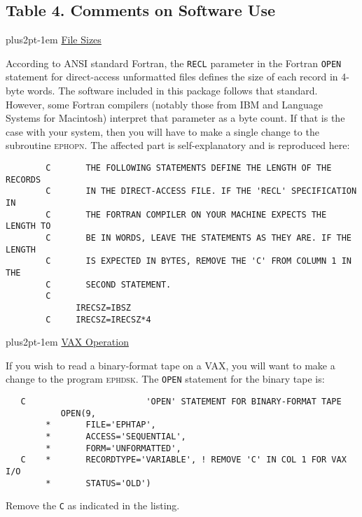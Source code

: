 \documentclass[twoside,11pt]{article}
\renewcommand{\_}{\texttt{\symbol{95}}}
\newcommand{\hdg}[1]{\vskip4pt plus2pt\leavevmode\kern-1em \underline{\large{#1}}\par}
\newcommand{\hdg}[1]{\subsection*{{#1}}}
\begin{document}
\begin{center}
\section*{Table 4. Comments on Software Use}
\end{center}

\hdg{File Sizes}

According to ANSI standard Fortran, the {\tt RECL} parameter in the
Fortran {\tt OPEN} statement for direct-access
unformatted files defines the size of each record in 4-byte words.
The software included in this package follows that standard.
However, some Fortran compilers (notably those from IBM
and Language Systems for Macintosh) interpret that parameter as a
byte count. If that is the case with your system, then you will have
to make a single change to the subroutine \textsc{ephopn}.
The affected part is self-explanatory and is reproduced here:
\begin{verbatim}
        C       THE FOLLOWING STATEMENTS DEFINE THE LENGTH OF THE RECORDS
        C       IN THE DIRECT-ACCESS FILE. IF THE 'RECL' SPECIFICATION IN
        C       THE FORTRAN COMPILER ON YOUR MACHINE EXPECTS THE LENGTH TO
        C       BE IN WORDS, LEAVE THE STATEMENTS AS THEY ARE. IF THE LENGTH
        C       IS EXPECTED IN BYTES, REMOVE THE 'C' FROM COLUMN 1 IN THE
        C       SECOND STATEMENT.
        C
              IRECSZ=IBSZ
        C     IRECSZ=IRECSZ*4
\end{verbatim}

\hdg{VAX Operation}

If you wish to read a binary-format tape on a VAX, you will want to
make a change to the program \textsc{ephdsk}. The {\tt OPEN} statement
for the binary tape is:
\begin{verbatim}
   C                        'OPEN' STATEMENT FOR BINARY-FORMAT TAPE
           OPEN(9,
        *       FILE='EPHTAP',
        *       ACCESS='SEQUENTIAL',
        *       FORM='UNFORMATTED',
   C    *       RECORDTYPE='VARIABLE', ! REMOVE 'C' IN COL 1 FOR VAX I/O
        *       STATUS='OLD')
\end{verbatim}
Remove the {\tt C} as indicated in the listing.
\end{document}
